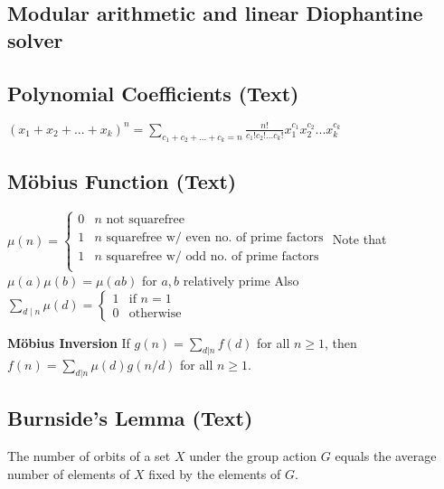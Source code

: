 \documentclass[12pt]{extarticle}
\begin{document}
\begin{multicols*}{2}
% 

\subsection{Modular arithmetic and linear Diophantine solver} %


\subsection{Polynomial Coefficients (Text)} %
$(x_1 + x_2 + ... + x_k)^n = \sum_{c_1 + c_2 + ... + c_k = n}
\frac{n!}{c_1! c_2! ... c_k!} x_1^{c_1} x_2^{c_2} ... x_k^{c_k}$

\subsection{M\"obius Function (Text)} %
$\mu(n) = \begin{cases}
0 & \text{$n$ not squarefree} \\
1 & \text{$n$ squarefree w/ even no. of prime factors} \\
1 & \text{$n$ squarefree w/ odd no. of prime factors} \\
\end{cases}$
Note that $\mu(a) \mu(b) = \mu(ab)$ for $a, b$ relatively prime
Also $\sum_{d \mid n} \mu(d) = \begin{cases} 1 & \text{if $n = 1$} \\
0 & \text{otherwise} \end{cases}$

\textbf{M\"obius Inversion}
If $g(n) = \sum_{d|n} f(d)$ for all $n \ge 1$, then
$f(n) = \sum_{d|n} \mu(d)g(n/d)$ for all $n \ge 1$.


\subsection{Burnside's Lemma (Text)} %
The number of orbits of a set $X$ under the group action $G$ equals the average
number of elements of $X$ fixed by the elements of $G$.


\end{multicols*}
\end{document}
